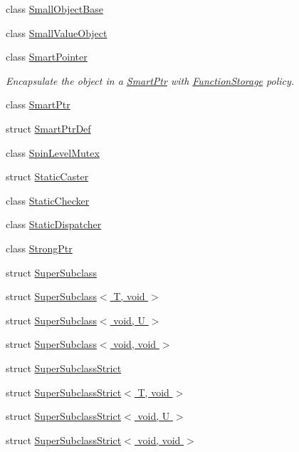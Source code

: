 \begin{DoxyCompactItemize}
\item 
class \hyperlink{classLoki_1_1SmallObjectBase}{Small\+Object\+Base}
\item 
class \hyperlink{classLoki_1_1SmallValueObject}{Small\+Value\+Object}
\item 
class \hyperlink{classLoki_1_1SmartPointer}{Smart\+Pointer}
\begin{DoxyCompactList}\small\item\em Encapsulate the object in a \hyperlink{classLoki_1_1SmartPtr}{Smart\+Ptr} with \hyperlink{classLoki_1_1FunctionStorage}{Function\+Storage} policy. \end{DoxyCompactList}\item 
class \hyperlink{classLoki_1_1SmartPtr}{Smart\+Ptr}
\item 
struct \hyperlink{structLoki_1_1SmartPtrDef}{Smart\+Ptr\+Def}
\item 
class \hyperlink{classLoki_1_1SpinLevelMutex}{Spin\+Level\+Mutex}
\item 
struct \hyperlink{structLoki_1_1StaticCaster}{Static\+Caster}
\item 
class \hyperlink{classLoki_1_1StaticChecker}{Static\+Checker}
\item 
class \hyperlink{classLoki_1_1StaticDispatcher}{Static\+Dispatcher}
\item 
class \hyperlink{classLoki_1_1StrongPtr}{Strong\+Ptr}
\item 
struct \hyperlink{structLoki_1_1SuperSubclass}{Super\+Subclass}
\item 
struct \hyperlink{structLoki_1_1SuperSubclass_3_01T_00_01void_01_4}{Super\+Subclass$<$ T, void $>$}
\item 
struct \hyperlink{structLoki_1_1SuperSubclass_3_01void_00_01U_01_4}{Super\+Subclass$<$ void, U $>$}
\item 
struct \hyperlink{structLoki_1_1SuperSubclass_3_01void_00_01void_01_4}{Super\+Subclass$<$ void, void $>$}
\item 
struct \hyperlink{structLoki_1_1SuperSubclassStrict}{Super\+Subclass\+Strict}
\item 
struct \hyperlink{structLoki_1_1SuperSubclassStrict_3_01T_00_01void_01_4}{Super\+Subclass\+Strict$<$ T, void $>$}
\item 
struct \hyperlink{structLoki_1_1SuperSubclassStrict_3_01void_00_01U_01_4}{Super\+Subclass\+Strict$<$ void, U $>$}
\item 
struct \hyperlink{structLoki_1_1SuperSubclassStrict_3_01void_00_01void_01_4}{Super\+Subclass\+Strict$<$ void, void $>$}
\item 

\end{DoxyCompactItemize}

